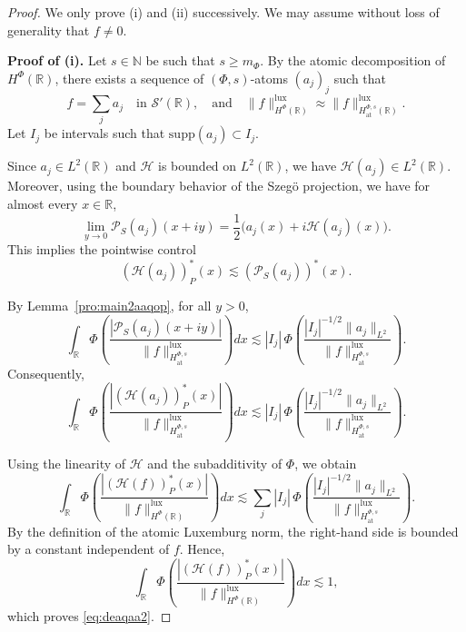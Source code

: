 \documentclass[a4paper,12pt,intlimits,oneside]{amsart}
\theoremstyle{definition}
\numberwithin{equation}{section}
\theoremstyle{definition}
\begin{document}
\begin{proof}
We only prove (i) and (ii) successively. We may assume without loss of generality that $f \neq 0$.

\medskip

\noindent\textbf{Proof of (i).}
Let $s \in \mathbb{N}$ be such that $s \ge m_{\Phi}$. By the atomic decomposition of $H^{\Phi}(\mathbb{R})$, there exists a sequence of $(\Phi,s)$-atoms $(a_j)_j$ such that
\[
f=\sum_{j} a_j \quad \text{in } \mathscr{S}'(\mathbb{R}),
\quad\text{and}\quad
\|f\|_{H^{\Phi}(\mathbb{R})}^{\mathrm{lux}}
\approx 
\|f\|_{H^{\Phi,s}_{\mathrm{at}}(\mathbb{R})}^{\mathrm{lux}}.
\]
Let $I_j$ be intervals such that $\mathrm{supp}(a_j)\subset I_j$.

Since $a_j \in L^2(\mathbb{R})$ and $\mathcal{H}$ is bounded on $L^2(\mathbb{R})$, we have $\mathcal{H}(a_j)\in L^2(\mathbb{R})$. Moreover, using the boundary behavior of the Szeg\"o projection, we have for almost every $x\in\mathbb{R}$,
\[
\lim_{y\to 0}\mathcal{P}_S(a_j)(x+iy)
=\frac12\big(a_j(x)+i\mathcal{H}(a_j)(x)\big).
\]
This implies the pointwise control
\[
(\mathcal{H}(a_j))_P^*(x)
\lesssim (\mathcal{P}_S(a_j))^*(x).
\]

By Lemma~\ref{pro:main2aaqop}, for all $y>0$,
\[
\int_{\mathbb{R}}
\Phi\!\left(
\frac{|\mathcal{P}_S(a_j)(x+iy)|}
{\|f\|_{H^{\Phi,s}_{\mathrm{at}}}^{\mathrm{lux}}}
\right)dx
\lesssim
|I_j|\,
\Phi\!\left(
\frac{|I_j|^{-1/2}\|a_j\|_{L^2}}
{\|f\|_{H^{\Phi,s}_{\mathrm{at}}}^{\mathrm{lux}}}
\right).
\]
Consequently,
\[
\int_{\mathbb{R}}
\Phi\!\left(
\frac{|(\mathcal{H}(a_j))_P^*(x)|}
{\|f\|_{H^{\Phi,s}_{\mathrm{at}}}^{\mathrm{lux}}}
\right)dx
\lesssim
|I_j|\,
\Phi\!\left(
\frac{|I_j|^{-1/2}\|a_j\|_{L^2}}
{\|f\|_{H^{\Phi,s}_{\mathrm{at}}}^{\mathrm{lux}}}
\right).
\]

Using the linearity of $\mathcal{H}$ and the subadditivity of $\Phi$, we obtain
\[
\int_{\mathbb{R}}
\Phi\!\left(
\frac{|(\mathcal{H}(f))_P^*(x)|}
{\|f\|_{H^{\Phi}(\mathbb{R})}^{\mathrm{lux}}
}
\right)dx
\lesssim
\sum_j
|I_j|\,
\Phi\!\left(
\frac{|I_j|^{-1/2}\|a_j\|_{L^2}}
{\|f\|_{H^{\Phi,s}_{\mathrm{at}}}^{\mathrm{lux}}}
\right).
\]
By the definition of the atomic Luxemburg norm, the right-hand side is bounded by a constant independent of $f$. Hence,
\[
\int_{\mathbb{R}}
\Phi\!\left(
\frac{|(\mathcal{H}(f))_P^*(x)|}
{\|f\|_{H^{\Phi}(\mathbb{R})}^{\mathrm{lux}}
}
\right)dx
\lesssim 1,
\]
which proves \eqref{eq:deaqaa2}.

\medskip


\end{proof}
\end{document}
